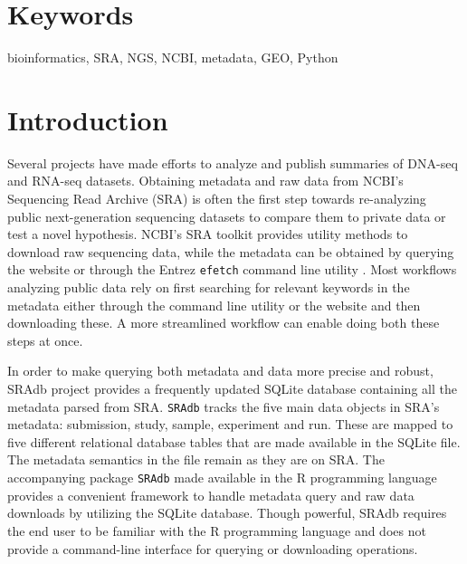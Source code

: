 \documentclass[9pt,a4paper]{extarticle}
\begin{document}
\section*{Keywords}
bioinformatics, SRA, NGS, NCBI, metadata, GEO, Python



\clearpage
\pagestyle{main}
\section*{Introduction}
Several projects have made efforts to analyze and publish summaries of DNA-seq \cite{macarthur2012systematic} and RNA-seq
\cite{lachmann2018massive, collado2017reproducible} datasets. Obtaining metadata
and raw data from NCBI's Sequencing Read Archive (SRA) \cite{leinonen2010sequence}
is often the first step towards re-analyzing public next-generation sequencing 
datasets to compare them to private data or test a novel hypothesis. NCBI's SRA
toolkit \cite{ncbisratoolit} provides utility methods to download raw sequencing
data, while the metadata can be obtained by querying the website or through the
Entrez \texttt{efetch} command line utility \cite{kans2018entrez}. Most workflows analyzing
public data rely on first searching for relevant keywords in the metadata either
through the command line utility or the website and then downloading these. A
more streamlined workflow can enable doing both these steps at once.


In order to make querying both metadata and data more precise and robust, SRAdb
\cite{zhu2013sradb} project provides a frequently updated SQLite database 
containing all the metadata parsed from SRA. \texttt{SRAdb} tracks the five main
data objects in SRA's metadata: submission, study, sample, experiment and run.
These are mapped to five different relational database tables that are made
available in the SQLite file. The metadata semantics in the file remain as they are on
SRA.
The accompanying package \texttt{SRAdb} \cite{zhudavissradb} made available in the R programming language \cite{rprog}
provides a convenient framework to handle metadata query and raw data downloads by utilizing the SQLite database. 
Though powerful, SRAdb requires the end user to be familiar 
with the R programming language and does not provide a command-line interface for
querying or downloading operations.
\end{document}
